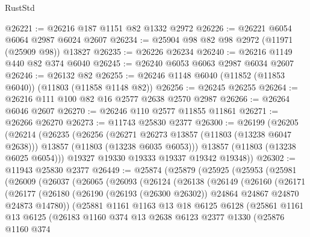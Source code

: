\begin{lexlean}{RustStd}
\begin{coremodule}
@26221 := @26216 @187 @1151 @82 @1332 @2972
@26226 := @26221 @6054 @6064 @2987 @6024 @2607
@26234 := @25904 @98 @82 @98 @2972 (@11971 (@25909 @98)) @13827
@26235 := @26226 @26234
@26240 := @26216 @1149 @440 @82 @374 @6040
@26245 := @26240 @6053 @6063 @2987 @6034 @2607
@26246 := @26132 @82
@26255 := @26246 @1148 @6040 (@11852 (@11853 @6040)) (@11803 (@11858 @1148 @82))
@26256 := @26245 @26255
@26264 := @26216 @111 @100 @82 @16 @2577 @2638 @2570 @2987
@26266 := @26264 @6046 @2607
@26270 := @26246 @110 @2577 @11855 @11861
@26271 := @26266 @26270
@26273 := @11743 @25830 @2377
@26300 := @26199
    (@26205
      (@26214
        (@26235
          (@26256
            (@26271 @26273 @13857 (@11803 (@13238 @6047 @2638)))
            @13857
            (@11803 (@13238 @6035 @6053)))
          @13857
          (@11803 (@13238 @6025 @6054)))
        @19327
        @19330
        @19333
        @19337
        @19342
        @19348))
@26302 := @11943 @25830 @2377
@26449 := @25874
    (@25879
      (@25925
        (@25953
          (@25981
            (@26009
              (@26037
                (@26065
                  (@26093
                    (@26124
                      (@26138
                        (@26149
                          (@26160
                            (@26171
                              (@26177
                                (@26180
                                  (@26190
                                    (@26193 (@26300 @26302))
                                    @24864
                                    @24867
                                    @24870
                                    @24873
                                    @14780))
                                (@25881
                                  @1161
                                  @1163
                                  @13
                                  @18
                                  @6125
                                  @6128
                                  (@25861
                                    @1161
                                    @13
                                    @6125
                                    (@26183
                                      @1160
                                      @374
                                      @13
                                      @2638
                                      @6123
                                      @2377
                                      @1330
                                      (@25876
                                        @1160
                                        @374

\end{coremodule}
\end{lexlean}
